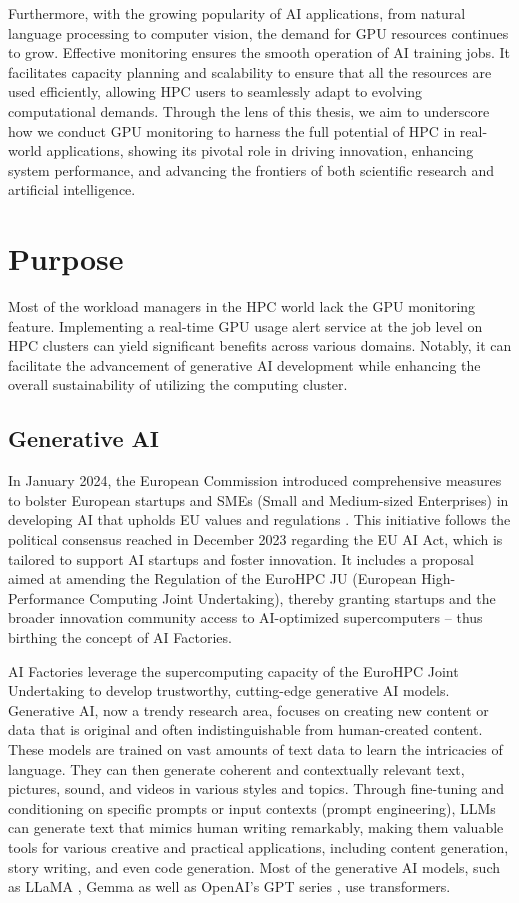 Furthermore, with the growing popularity of AI applications, from natural language processing to computer vision, the demand for GPU resources continues to grow. Effective monitoring ensures the smooth operation of AI training jobs. It facilitates capacity planning and scalability to ensure that all the resources are used efficiently, allowing HPC users to seamlessly adapt to evolving computational demands. Through the lens of this thesis, we aim to underscore how we conduct GPU monitoring to harness the full potential of HPC in real-world applications, showing its pivotal role in driving innovation, enhancing system performance, and advancing the frontiers of both scientific research and artificial intelligence.

\section{Purpose}
Most of the workload managers in the HPC world lack the GPU monitoring feature. Implementing a real-time GPU usage alert service at the job level on HPC clusters can yield significant benefits across various domains. Notably, it can facilitate the advancement of generative AI development while enhancing the overall sustainability of utilizing the computing cluster.

\subsection{Generative AI}
In January 2024, the European Commission introduced comprehensive measures to bolster European startups and SMEs (Small and Medium-sized Enterprises) in developing AI that upholds EU values and regulations \cite{eu-ai}. This initiative follows the political consensus reached in December 2023 regarding the EU AI Act, which is tailored to support AI startups and foster innovation. It includes a proposal aimed at amending the Regulation of the EuroHPC JU (European High-Performance Computing Joint Undertaking), thereby granting startups and the broader innovation community access to AI-optimized supercomputers -- thus birthing the concept of AI Factories.

AI Factories leverage the supercomputing capacity of the EuroHPC Joint Undertaking to develop trustworthy, cutting-edge generative AI models. Generative AI, now a trendy research area, focuses on creating new content or data that is original and often indistinguishable from human-created content. These models are trained on vast amounts of text data to learn the intricacies of language. They can then generate coherent and contextually relevant text, pictures, sound, and videos in various styles and topics. Through fine-tuning and conditioning on specific prompts or input contexts (prompt engineering), LLMs can generate text that mimics human writing remarkably, making them valuable tools for various creative and practical applications, including content generation, story writing, and even code generation. Most of the generative AI models, such as LLaMA \cite{touvron2023llama}, Gemma \cite{gemmateam2024gemma} as well as OpenAI's GPT series \cite{openai2024gpt4}, use transformers. 

